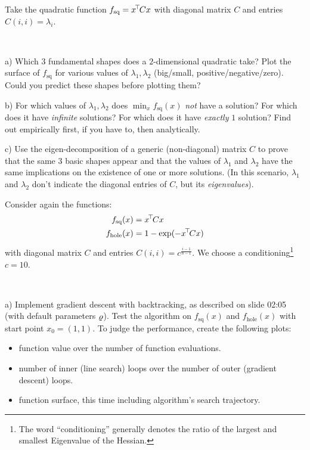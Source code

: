 

\renewcommand{\course}{Optimization}
\renewcommand{\coursepicture}{optim}
\renewcommand{\coursedate}{Summer 2015}
\renewcommand{\exnum}{2}

\exercises



Take the quadratic function $f_\text{sq} = x^{\!\top\!} C x$ with diagonal matrix $C$
and entries $C(i, i)=\lambda_i$.

~

a) Which $3$ fundamental shapes does a $2$-dimensional quadratic take?  Plot
the surface of $f_\text{sq}$ for various values of $\lambda_1, \lambda_2$
(big/small, positive/negative/zero).  Could you predict these shapes before
plotting them?

b) For which values of $\lambda_1, \lambda_2$ does $\min_x f_\text{sq}(x)$
\emph{not} have a solution?  For which does it have \emph{infinite} solutions?
For which does it have \emph{exactly} $1$ solution?  Find out empirically
first, if you have to, then analytically.

c) Use the eigen-decomposition of a generic (non-diagonal) matrix $C$ to prove
that the same $3$ basic shapes appear and that the values of $\lambda_1$ and
$\lambda_2$ have the same implications on the existence of one or more
solutions.  (In this scenario, $\lambda_1$ and $\lambda_2$ don't indicate the
diagonal entries of $C$, but its \emph{eigenvalues}).




Consider again the functions:
\begin{align}
f_\text{sq}(x)
 &= x^{\!\top\!} C x \\
f_\text{hole}(x)
 &= 1-\exp(-x^{\!\top\!} C x)
\end{align}
with diagonal matrix $C$ and entries $C(i,i) =
c^{\frac{i-1}{n-1}}$. We choose a conditioning\footnote{The
word ``conditioning'' generally denotes the ratio of the largest and
smallest Eigenvalue of the Hessian.} $c=10$.

~

a) Implement gradient descent with backtracking, as described on slide
02:05 (with default parameters $\varrho$). Test the algorithm on
$f_\text{sq}(x)$ and $f_\text{hole}(x)$ with start point
$x_0=(1,1)$. To judge the performance, create the following plots:
\begin{itemize}
  \item function value over the number of function evaluations.
  \item number of inner (line search) loops over the number of outer (gradient descent) loops.
  \item function surface, this time including algorithm's search trajectory.
\end{itemize}

